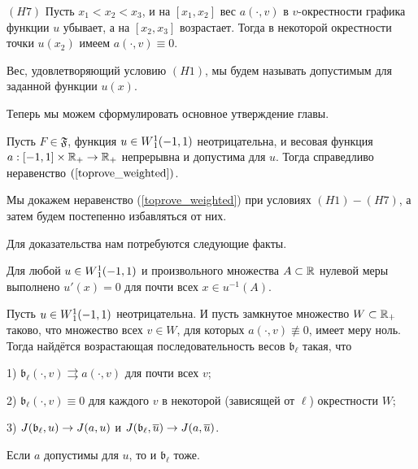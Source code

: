 \bigskip
\noindent
$(H7)$ Пусть $x_1 < x_2 < x_3$,
и на $[x_1, x_2]$ вес $a(\cdot, v)$ в $v$-окрестности графика функции $u$ убывает,
а на $[x_2, x_3]$ возрастает.
Тогда в некоторой окрестности точки $u(x_2)$ имеем $a(\cdot, v) \equiv 0$.

\bigskip

Вес, удовлетворяющий условию $(H1)$, мы будем называть допустимым для заданной функции $u(x)$.

\medskip

Теперь мы можем сформулировать основное утверждение главы.
\begin{thm}
\label{unbounded_growth_thm}
Пусть $F \in \mathfrak{F}$, функция $u \in W{}_1^1(-1, 1)$ неотрицательна,
и весовая функция $a: [-1, 1] \times \mathbb R_+ \to \mathbb R_+$ непрерывна
и допустима для $u$.
Тогда справедливо неравенство $(\ref{toprove_weighted})$.
\end{thm}

Мы докажем неравенство (\ref{toprove_weighted}) при условиях $(H1)-(H7)$,
а затем будем постепенно избавляться от них.

Для доказательства нам потребуются следующие факты.

\begin{prop}
\label{levelDerivative}
\textrm{\cite[теорема 6.19]{LiebLoss} }
Для любой $u \in W{}_1^1(-1, 1)$ и произвольного множества $A \subset \mathbb R$ нулевой меры выполнено
$u'(x) = 0$ для почти всех $x \in u^{-1}(A)$.
\end{prop}

\begin{lm}
\label{zeroApprox}
Пусть $u \in W{}_1^1(-1, 1)$ неотрицательна.
И пусть замкнутое множество $W \subset \mathbb R_+$ таково, что множество всех $v \in W$, для которых $a(\cdot, v) \not\equiv 0$, имеет меру ноль.
Тогда найдётся возрастающая последовательность весов $\mathfrak b_{\ell}$ такая, что

1) $\mathfrak b_{\ell}(\cdot, v) \rightrightarrows a(\cdot, v)$ для почти всех $v$;

2) $\mathfrak b_{\ell}(\cdot, v) \equiv 0$ для каждого $v$ в некоторой (зависящей от $\ell$) окрестности $W$;

3) $J(\mathfrak b_{\ell}, u) \to J(a, u)$ и $\IWg(\mathfrak b_{\ell}, \mon{u}) \to \IWg(a, \mon{u})$.
\end{lm}

\begin{rem}
Если $a$ допустимы для $u$, то и $\mathfrak b_{\ell}$ тоже.
\end{rem}


